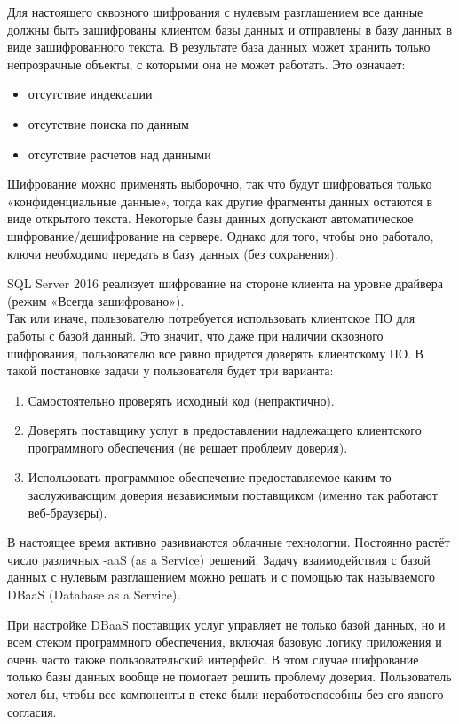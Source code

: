 Для настоящего сквозного шифрования с нулевым разглашением все данные должны быть зашифрованы
клиентом базы данных и отправлены в базу данных в виде зашифрованного текста. В результате база
данных может хранить только непрозрачные объекты, с которыми она не может работать. Это означает:
\begin{itemize}
    \item отсутствие индексации
    \item отсутствие поиска по данным
    \item отсутствие расчетов над данными
\end{itemize}

Шифрование можно применять выборочно, так что будут шифроваться только «конфиденциальные данные», тогда
как другие фрагменты данных остаются в виде открытого текста.
Некоторые базы данных допускают автоматическое шифрование/дешифрование на сервере. Однако
для того, чтобы оно работало, ключи необходимо передать в базу данных (без сохранения).

SQL Server 2016 реализует шифрование на стороне клиента на уровне драйвера (режим «Всегда
зашифровано»). \\

Так или иначе, пользователю потребуется использовать клиентское ПО для работы с базой данный.
Это значит, что даже при наличии сквозного шифрования, пользователю все равно придется доверять
клиентскому ПО. В такой постановке задачи у пользователя будет три варианта:
\begin{enumerate}
    \item Самостоятельно проверять исходный код (непрактично).
    \item Доверять поставщику услуг в предоставлении надлежащего
        клиентского программного обеспечения (не решает проблему доверия).
    \item Использовать программное обеспечение предоставляемое каким-то заслуживающим
        доверия независимым поставщиком (именно так работают веб-браузеры).
\end{enumerate}

В настоящее время активно разивиаются облачные технологии. Постоянно растёт число различных -aaS
(as a Service) решений.
Задачу взаимодействия с базой данных с нулевым разглашением можно решать и с помощью так
называемого DBaaS (Database as a Service).

При настройке DBaaS поставщик услуг управляет не только базой данных, но и всем стеком
программного обеспечения, включая базовую логику приложения и очень часто также
пользовательский интерфейс. В этом случае шифрование только базы данных вообще не помогает
решить проблему доверия. Пользователь хотел бы, чтобы все компоненты в стеке были
неработоспособны без его явного согласия.

